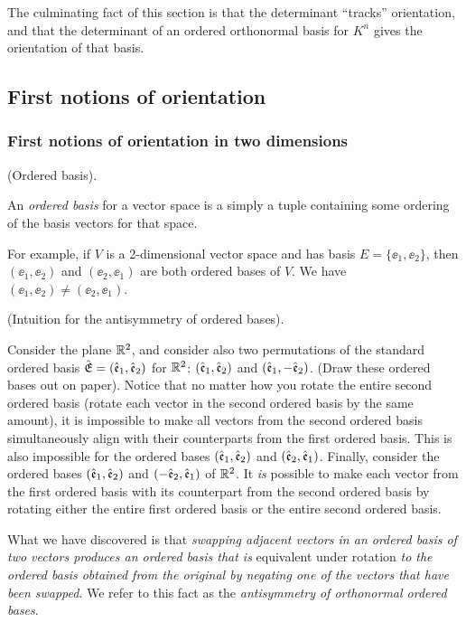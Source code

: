 The culminating fact of this section is that the determinant ``tracks'' orientation, and that the determinant of an ordered orthonormal basis for $K^n$ gives the orientation of that basis.

\subsection*{First notions of orientation}

\subsubsection*{First notions of orientation in two dimensions}

\begin{defn}
    (Ordered basis).
    
    An \textit{ordered basis} for a vector space is a simply a tuple containing some ordering of the basis vectors for that space.
    
    For example, if $V$ is a 2-dimensional vector space and has basis $E = \{\ee_1, \ee_2\}$, then $(\ee_1, \ee_2)$ and $(\ee_2, \ee_1)$ are both ordered bases of $V$. We have $(\ee_1, \ee_2) \neq (\ee_2, \ee_1)$.
\end{defn}

\begin{deriv}
\label{ch::lin_alg::deriv::ordered_bases_antisymmetry_intuition}
    (Intuition for the antisymmetry of ordered bases).
    
    Consider the plane $\mathbb{R}^2$, and consider also two permutations of the standard ordered basis ${\hat{\mathfrak{E}}} = (\hat{\mathfrak{e}}_1, \hat{\mathfrak{e}}_2)$ for $\mathbb{R}^2$: $(\hat{\mathfrak{e}}_1, \hat{\mathfrak{e}}_2)$ and $(\hat{\mathfrak{e}}_1, -\hat{\mathfrak{e}}_2)$. (Draw these ordered bases out on paper). Notice that no matter how you rotate the entire second ordered basis (rotate each vector in the second ordered basis by the same amount), it is impossible to make all vectors from the second ordered basis simultaneously align with their counterparts from the first ordered basis. This is also impossible for the ordered bases $(\hat{\mathfrak{e}}_1, \hat{\mathfrak{e}}_2)$ and $(\hat{\mathfrak{e}}_2, \hat{\mathfrak{e}}_1)$. Finally, consider the ordered bases $(\hat{\mathfrak{e}}_1, \hat{\mathfrak{e}}_2)$ and $(-\hat{\mathfrak{e}}_2, \hat{\mathfrak{e}}_1)$ of $\mathbb{R}^2$. It \textit{is} possible to make each vector from the first ordered basis with its counterpart from the second ordered basis by rotating either the entire first ordered basis or the entire second ordered basis.
    
    What we have discovered is that \textit{swapping adjacent vectors in an ordered basis of two vectors produces an ordered basis that is} equivalent under rotation \textit{to the ordered basis obtained from the original by negating one of the vectors that have been swapped}. We refer to this fact as the \textit{antisymmetry of orthonormal ordered bases}.
\end{deriv}

